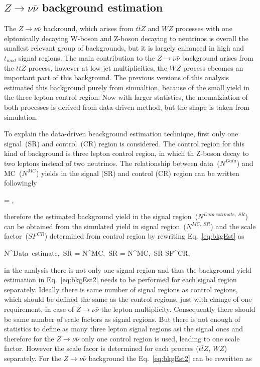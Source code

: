 \subsection{$Z \to \nu \bar{\nu}$ background estimation}

The $Z \to \nu \bar{\nu}$ backround, which arises from $t\bar{t}Z$ and $WZ$ processes with one elptonically decaying W-boson and Z-boson decaying to neutrinos is overall the smallest relevant group of backgrounds, but it is largely enhanced in high \MET and $t_{mod}$ signal regions. The main contribution to the $Z \to \nu \bar{\nu}$ background arises from  the $t\bar{t}Z$ process, however at low jet multiplicities, the $WZ$ process ebcomes an important part of this background.  The previous versions of this analysis estimated this background purely from simualtion, because of the small yield in the three lepton control region. Now with larger statistics, the normalziation of both processes is derived from data-driven method, but the shape is taken from simulation. 

  
To explain the data-driven beackground estimation technique, first only one signal~(SR) and control~(CR) region is considered. The control region for this kind of background is three lepton control region, in which th Z-boson decay to two leptons instead of two neutrinos. The relationship between data~($N^{Data}$) and MC~($N^{MC}$) yields in the signal (SR) and control (CR) region can be written followingly

{
  = ,
}

therefore the estimated background yield in the signal region~($N^{Data~estimate,~SR}$) can be obtained from the simulated yield in signal region~($N^{MC,~SR}$) and the scale factor~($SF^{CR}$) determined from control region by rewriting Eq.~\ref{eq:bkgEst} as

{
N^{Data~estimate,~SR}  = N^{MC,~SR} \times  {} = N^{MC,~SR} \times  SF^{CR},
}

in the analysis there is not only one signal region and thus the background yield estimation in Eq.~\ref{eq:bkgEst2} needs to be performed for each signal region separately. Ideally there is same number of signal regions as control regions, which should be defined the same as the control regions, just with change of one requirement, in case of $Z \to \nu \bar{\nu}$ the lepton multiplicity. Consequently there should be same number of scale factors as signal regions.  But there is not enough of statistics to define as many three lepton signal regions asi the signal ones and therefore for the $Z \to \nu \bar{\nu}$ only one control region is used, leading to one scale factor. However the scale facor is determined for each procces ($t\bar{t}Z$, $WZ$) separately. For the $Z \to \nu \bar{\nu}$ background the Eq.~\ref{eq:bkgEst2} can be rewritten as

